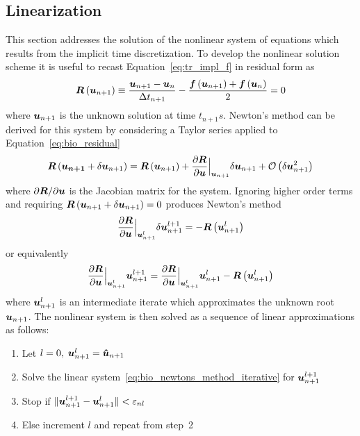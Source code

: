 \subsection{Linearization \label{sect:bio_linearization}}
This section addresses the solution of the nonlinear system of equations which results from the implicit time discretization. To develop the nonlinear solution scheme it is useful to recast Equation~\eqref{eq:tr_impl_f} in residual form as
\begin{equation}
  \label{eq:bio_residual}
  {\boldsymbol{R}}\left({\boldsymbol{u}}_{n+1}\right) \equiv \frac{{\boldsymbol{u}}_{n+1}-{\boldsymbol{u}}_n}{\Delta t_{n+1}} - \frac{{\boldsymbol{f}}\left({\boldsymbol{u}}_{n+1}\right) + {\boldsymbol{f}}\left({\boldsymbol{u}}_n\right)}{2} = 0
\end{equation}
where ${\boldsymbol{u}}_{n+1}$ is the unknown solution at time $t_{n+1}s$.  Newton's method can be derived for this system by considering a Taylor series applied to Equation~\eqref{eq:bio_residual}
\begin{equation}
  \label{eq:bio_taylor_series}
  {\boldsymbol{R}}\left({\boldsymbol{u_{n+1}}} + \delta{\boldsymbol{u}}_{n+1}\right) =
    {\boldsymbol{R}}\left({\boldsymbol{u}}_{n+1}\right) +
    {\frac{\partial{{\boldsymbol{R}}}}{\partial{{\boldsymbol{u}}}}}\Big|_{{\boldsymbol{u}}_{n+1}}\delta{\boldsymbol{u}}_{n+1} +
    \mathcal{O}\left(\delta{\boldsymbol{u}}_{n+1}^2\right)
\end{equation}
where $\partial{\boldsymbol{R}}/\partial{\boldsymbol{u}}$ is the Jacobian matrix for the system.  Ignoring higher order terms and requiring ${\boldsymbol{R}}\left({\boldsymbol{u}}_{n+1} + \delta{\boldsymbol{u}}_{n+1}\right)=0$  produces Newton's method
\begin{equation}
  \label{eq:bio_newtons_method}
  {\frac{\partial{{\boldsymbol{R}}}}{\partial{{\boldsymbol{u}}}}}\Big|_{{\boldsymbol{u}}_{n+1}^l}\delta{\boldsymbol{u}}_{n+1}^{l+1} =
    -{\boldsymbol{R}}\left({\boldsymbol{u}}_{n+1}^l\right)
\end{equation}
or equivalently 
\begin{equation}
  \label{eq:bio_newtons_method_iterative}
  {\frac{\partial{{\boldsymbol{R}}}}{\partial{{\boldsymbol{u}}}}}\Big|_{{\boldsymbol{u}}_{n+1}^l}{\boldsymbol{u}}_{n+1}^{l+1} =
  {\frac{\partial{{\boldsymbol{R}}}}{\partial{{\boldsymbol{u}}}}}\Big|_{{\boldsymbol{u}}_{n+1}^l}{\boldsymbol{u}}_{n+1}^{l}-{\boldsymbol{R}}\left({\boldsymbol{u}}_{n+1}^l\right)
\end{equation}
where ${\boldsymbol{u}}_{n+1}^l$ is an intermediate iterate which approximates the unknown root ${\boldsymbol{u}}_{n+1}$.
The nonlinear system is then solved as a sequence of linear approximations as follows:
\begin{enumerate}
  \tightlist
  \item Let $l=0,\;{\boldsymbol{u}}_{n+1}^l={\boldsymbol{\hat{u}}}_{n+1}$
  \item Solve the linear system~\eqref{eq:bio_newtons_method_iterative} for ${\boldsymbol{u}}_{n+1}^{l+1}$
  \item Stop if $\|{\boldsymbol{u}}_{n+1}^{l+1}-{\boldsymbol{u}}_{n+1}^l\|<\varepsilon_{nl}$%
  \item Else increment $l$ and repeat from step~2
\end{enumerate}

